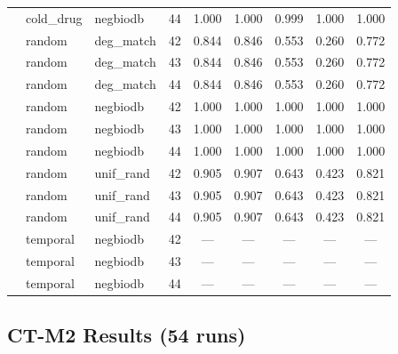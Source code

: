 \begin{table}[h]
\begin{tabular}{@{}lllrccccc@{}}
& cold\_drug & negbiodb & 44 & 1.000 & 1.000 & 0.999 & 1.000 & 1.000 \\
& random & deg\_match & 42 & 0.844 & 0.846 & 0.553 & 0.260 & 0.772 \\
& random & deg\_match & 43 & 0.844 & 0.846 & 0.553 & 0.260 & 0.772 \\
& random & deg\_match & 44 & 0.844 & 0.846 & 0.553 & 0.260 & 0.772 \\
& random & negbiodb & 42 & 1.000 & 1.000 & 1.000 & 1.000 & 1.000 \\
& random & negbiodb & 43 & 1.000 & 1.000 & 1.000 & 1.000 & 1.000 \\
& random & negbiodb & 44 & 1.000 & 1.000 & 1.000 & 1.000 & 1.000 \\
& random & unif\_rand & 42 & 0.905 & 0.907 & 0.643 & 0.423 & 0.821 \\
& random & unif\_rand & 43 & 0.905 & 0.907 & 0.643 & 0.423 & 0.821 \\
& random & unif\_rand & 44 & 0.905 & 0.907 & 0.643 & 0.423 & 0.821 \\
& temporal & negbiodb & 42 & --- & --- & --- & --- & --- \\
& temporal & negbiodb & 43 & --- & --- & --- & --- & --- \\
& temporal & negbiodb & 44 & --- & --- & --- & --- & --- \\
\bottomrule
\end{tabular}
\end{table}

\clearpage

\subsection{CT-M2 Results (54 runs)}

